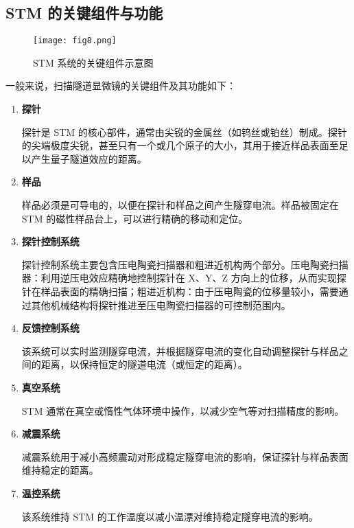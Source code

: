 \documentclass{article}
\begin{document}
\begin{spacing}{1.625}
	
	
	
	
	\subsection{STM 的关键组件与功能}
	\begin{figure}[htbp]
		\centering 
		\texttt{[image: fig8.png]}
		\caption{STM 系统的关键组件示意图}
	\end{figure}	
	一般来说，扫描隧道显微镜的关键组件及其功能如下：
	\begin{enumerate}
		\item \textbf{探针}\par
		\qquad 探针是 STM 的核心部件，通常由尖锐的金属丝（如钨丝或铂丝）制成。探针的尖端极度尖锐，甚至只有一个或几个原子的大小，其用于接近样品表面至足以产生量子隧道效应的距离。
		
		\item \textbf{样品}\par
		\qquad 样品必须是可导电的，以便在探针和样品之间产生隧穿电流。样品被固定在 STM 的磁性样品台上，可以进行精确的移动和定位。
		
		\item \textbf{探针控制系统}\par
		\qquad 探针控制系统主要包含压电陶瓷扫描器和粗进近机构两个部分。压电陶瓷扫描器：利用逆压电效应精确地控制探针在 X、Y、Z 方向上的位移，从而实现探针在样品表面的精确扫描；粗进近机构：由于压电陶瓷的位移量较小，需要通过其他机械结构将探针推进至压电陶瓷扫描器的可控制范围内。
		
		\item \textbf{反馈控制系统}\par
		\qquad 该系统可以实时监测隧穿电流，并根据隧穿电流的变化自动调整探针与样品之间的距离，以保持恒定的隧道电流（或恒定的距离）。
		
		\item \textbf{真空系统}\par
		\qquad STM 通常在真空或惰性气体环境中操作，以减少空气等对扫描精度的影响。
		
		\item \textbf{减震系统}\par
		\qquad 减震系统用于减小高频震动对形成稳定隧穿电流的影响，保证探针与样品表面维持稳定的距离。
		
		\item \textbf{温控系统}\par
		\qquad 该系统维持 STM 的工作温度以减小温漂对维持稳定隧穿电流的影响。
		

\end{enumerate}
\end{spacing}
\end{document}
